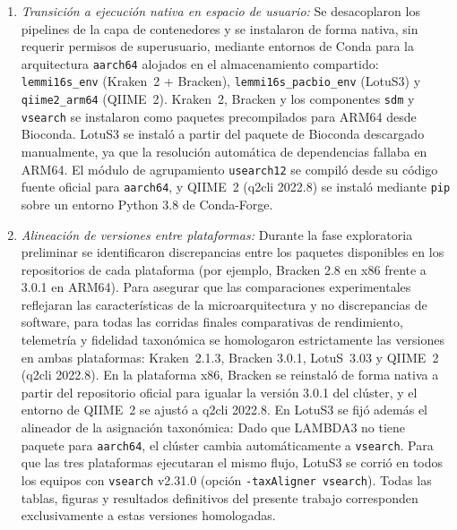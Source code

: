\documentclass[12pt,oneside,spanish]{book}
\begin{document}
    \begin{enumerate}
        \item \textit{Transición a ejecución nativa en espacio de usuario:} Se desacoplaron los pipelines de la capa de contenedores y se instalaron de forma nativa, sin requerir permisos de superusuario, mediante entornos de Conda para la arquitectura \texttt{aarch64} alojados en el almacenamiento compartido: \texttt{lemmi16s\_env} (Kraken~2 + Bracken), \texttt{lemmi16s\_pacbio\_env} (LotuS3) y \texttt{qiime2\_arm64} (QIIME~2). Kraken~2, Bracken y los componentes \texttt{sdm} y \texttt{vsearch} se instalaron como paquetes precompilados para ARM64 desde Bioconda. LotuS3 se instaló a partir del paquete de Bioconda descargado manualmente, ya que la resolución automática de dependencias fallaba en ARM64. El módulo de agrupamiento \texttt{usearch12} se compiló desde su código fuente oficial para \texttt{aarch64}, y QIIME~2 (q2cli 2022.8) se instaló mediante \texttt{pip} sobre un entorno Python 3.8 de Conda-Forge.
    
        \item \textit{Alineación de versiones entre plataformas:} Durante la fase exploratoria preliminar se identificaron discrepancias entre los paquetes disponibles en los repositorios de cada plataforma (por ejemplo, Bracken 2.8 en x86 frente a 3.0.1 en ARM64). Para asegurar que las comparaciones experimentales reflejaran las características de la microarquitectura y no discrepancias de software, para todas las corridas finales comparativas de rendimiento, telemetría y fidelidad taxonómica se homologaron estrictamente las versiones en ambas plataformas: Kraken~2.1.3, Bracken 3.0.1, LotuS~3.03 y QIIME~2 (q2cli 2022.8). En la plataforma x86, Bracken se reinstaló de forma nativa a partir del repositorio oficial para igualar la versión 3.0.1 del clúster, y el entorno de QIIME~2 se ajustó a q2cli 2022.8. En LotuS3 se fijó además el alineador de la asignación taxonómica: Dado que LAMBDA3 no tiene paquete para \texttt{aarch64}, el clúster cambia automáticamente a \texttt{vsearch}. Para que las tres plataformas ejecutaran el mismo flujo, LotuS3 se corrió en todos los equipos con \texttt{vsearch} v2.31.0 (opción \texttt{-taxAligner vsearch}). Todas las tablas, figuras y resultados definitivos del presente trabajo corresponden exclusivamente a estas versiones homologadas.
    

\end{enumerate}
\end{document}
